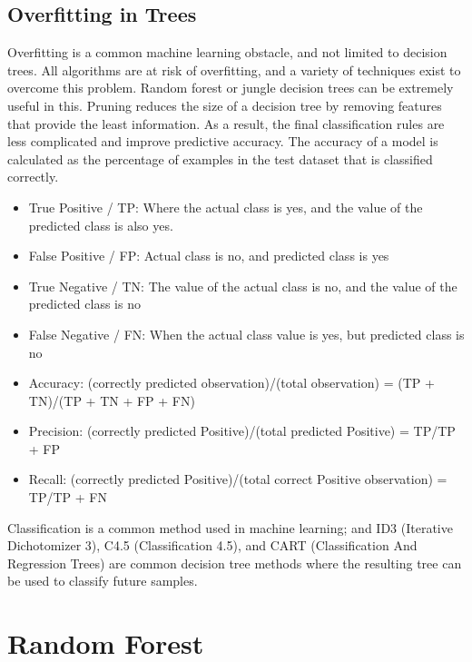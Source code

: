 \documentclass[12pt]{article}
\begin{document}
\subsection{Overfitting in Trees}
Overfitting is a common machine learning obstacle, and not limited
to decision trees. All algorithms are at risk of overfitting, and a variety
of techniques exist to overcome this problem. Random forest or jungle
decision trees can be extremely useful in this.
Pruning reduces the size of a decision tree by removing features that
provide the least information. As a result, the final classification rules are
less complicated and improve predictive accuracy.
The accuracy of a model is calculated as the percentage of examples in
the test dataset that is classified correctly.

\begin{itemize}

\item{True Positive / TP: Where the actual class is yes, and
the value of the predicted class is also yes.}

\item{False Positive / FP: Actual class is no, and predicted
class is yes}

\item{True Negative / TN: The value of the actual class is no,
and the value of the predicted class is no}

\item{False Negative / FN: When the actual class value is yes,
but predicted class is no}

\item{Accuracy: (correctly predicted observation)/(total
observation) = (TP + TN)/(TP + TN + FP + FN)}

\item{Precision: (correctly predicted Positive)/(total
predicted Positive) = TP/TP + FP}

\item{Recall: (correctly predicted Positive)/(total correct
Positive observation) = TP/TP + FN}

\end{itemize}

Classification is a common method used in machine learning; and
ID3 (Iterative Dichotomizer 3), C4.5 (Classification 4.5), and CART
(Classification And Regression Trees) are common decision tree methods
where the resulting tree can be used to classify future samples.
\newpage
\section{Random Forest}
\end{document}
